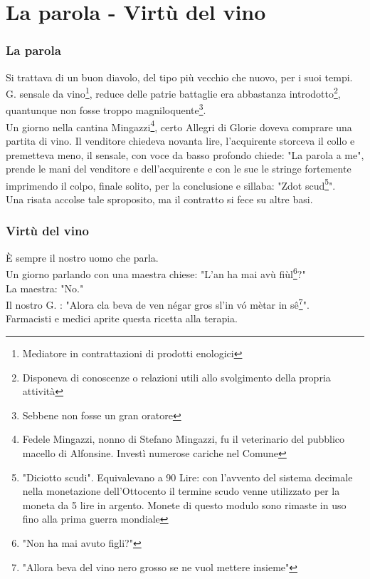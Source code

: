 
\chapter{La parola - Virtù del vino}
\subsection{La parola}
Si trattava di un buon diavolo, del tipo più vecchio che nuovo, per i suoi tempi. G. \: \: sensale da vino\footnote{Mediatore in contrattazioni di prodotti enologici}, reduce delle patrie battaglie era abbastanza introdotto\footnote{Disponeva di conoscenze o relazioni utili allo svolgimento della propria attività}, quantunque non fosse troppo magniloquente\footnote{Sebbene non fosse un gran oratore}.\\
Un giorno nella cantina Mingazzi\footnote{Fedele Mingazzi, nonno di Stefano Mingazzi, fu il veterinario del pubblico macello di Alfonsine. Investì numerose cariche nel Comune}, certo Allegri di Glorie doveva comprare una partita di vino. Il venditore chiedeva novanta lire, l'acquirente storceva il collo e premetteva meno, il sensale, con voce da basso profondo chiede: "La parola a me", prende le mani del venditore e dell'acquirente e con le sue le stringe fortemente imprimendo il colpo, finale solito, per la conclusione e sillaba: "Zdot scud\footnote{"Diciotto scudi". Equivalevano a 90 Lire: con l'avvento del sistema decimale nella monetazione dell'Ottocento il termine scudo venne utilizzato per la moneta da 5 lire in argento. Monete di questo modulo sono rimaste in uso fino alla prima guerra mondiale}".\\
Una risata accolse tale sproposito, ma il contratto si fece su altre basi.
\subsection{Virtù del vino}
È sempre il nostro uomo che parla.\\
Un giorno parlando con una maestra chiese: "L'an ha mai avù fiùl\footnote{"Non ha mai avuto figli?"}?"\\
La maestra: "No."\\
Il nostro G. \:\:\:\:: "Alora cla beva de ven négar gros sl'in vó mètar in sê\footnote{"Allora beva del vino nero grosso se ne vuol mettere insieme"}".\\
Farmacisti e medici aprite questa ricetta alla terapia. 

